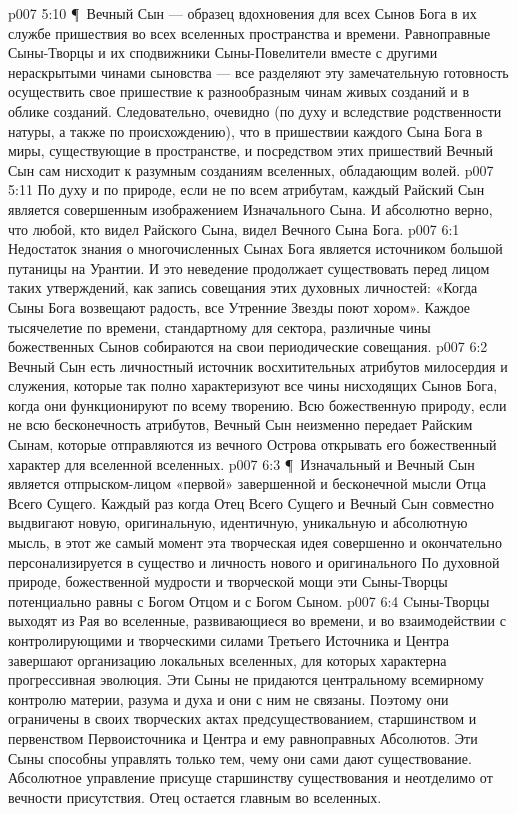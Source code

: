 \vs p007 5:10 \P\ Вечный Сын --- образец вдохновения для всех Сынов Бога в их службе пришествия во всех вселенных пространства и времени. Равноправные Сыны\hyp{}Творцы и их сподвижники Сыны\hyp{}Повелители вместе с другими нераскрытыми чинами сыновства --- все разделяют эту замечательную готовность осуществить свое пришествие к разнообразным чинам живых созданий и в облике созданий. Следовательно, очевидно (по духу и вследствие родственности натуры, а также по происхождению), что в пришествии каждого Сына Бога в миры, существующие в пространстве, и посредством этих пришествий Вечный Сын сам нисходит к разумным созданиям вселенных, обладающим волей.
\vs p007 5:11 По духу и по природе, если не по всем атрибутам, каждый Райский Сын является совершенным изображением Изначального Сына. И абсолютно верно, что любой, кто видел Райского Сына, видел Вечного Сына Бога.
\vs p007 6:1 Недостаток знания о многочисленных Сынах Бога является источником большой путаницы на Урантии. И это неведение продолжает существовать перед лицом таких утверждений, как запись совещания этих духовных личностей: «Когда Сыны Бога возвещают радость, все Утренние Звезды поют хором». Каждое тысячелетие по времени, стандартному для сектора, различные чины божественных Сынов собираются на свои периодические совещания.
\vs p007 6:2 Вечный Сын есть личностный источник восхитительных атрибутов милосердия и служения, которые так полно характеризуют все чины нисходящих Сынов Бога, когда они функционируют по всему творению. Всю божественную природу, если не всю бесконечность атрибутов, Вечный Сын неизменно передает Райским Сынам, которые отправляются из вечного Острова открывать его божественный характер для вселенной вселенных.
\vs p007 6:3 \P\ Изначальный и Вечный Сын является отпрыском\hyp{}лицом «первой» завершенной и бесконечной мысли Отца Всего Сущего. Каждый раз когда Отец Всего Сущего и Вечный Сын совместно выдвигают новую, оригинальную, идентичную, уникальную и абсолютную мысль, в этот же самый момент эта творческая идея совершенно и окончательно персонализируется в существо и личность нового и оригинального  По духовной природе, божественной мудрости и творческой мощи эти Сыны\hyp{}Творцы потенциально равны с Богом Отцом и с Богом Сыном.
\vs p007 6:4 Cыны\hyp{}Творцы выходят из Рая во вселенные, развивающиеся во времени, и во взаимодействии с контролирующими и творческими силами Третьего Источника и Центра завершают организацию локальных вселенных, для которых характерна прогрессивная эволюция. Эти Сыны не придаются центральному всемирному контролю материи, разума и духа и они с ним не связаны. Поэтому они ограничены в своих творческих актах предсуществованием, старшинством и первенством Первоисточника и Центра и ему равноправных Абсолютов. Эти Сыны способны управлять только тем, чему они сами дают существование. Абсолютное управление присуще старшинству существования и неотделимо от вечности присутствия. Отец остается главным во вселенных.
